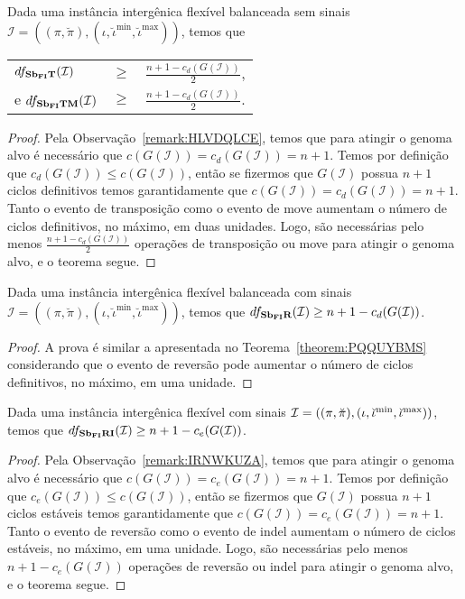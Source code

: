\begin{theorem}\label{theorem:PQQUYBMS}
Dada uma instância intergênica flexível balanceada sem sinais $\mathcal{I} = ((\pi,\breve\pi),(\iota,\breve\iota^{\min},\breve\iota^{\max}))$, temos que

\begin{tabular}{lll}
  $df_{\textbf{Sb\textsubscript{FI}T}}(\mathcal{I})$      & $ \ge $ & $\frac{{n+1} - c_d(G(\mathcal{I} ))}{2}$, \\
  e $df_{\textbf{Sb\textsubscript{FI}TM}}(\mathcal{I})$   & $ \ge $ & $\frac{{n+1} - c_d(G(\mathcal{I} ))}{2}$. \\
\end{tabular}
\end{theorem}
\begin{proof}
Pela Observação~\ref{remark:HLVDQLCE}, temos que para atingir o genoma alvo é necessário que $c(G(\mathcal{I})) = c_d(G(\mathcal{I})) = n+1$. Temos por definição que $c_d(G(\mathcal{I})) \le c(G(\mathcal{I}))$, então se fizermos que $G(\mathcal{I})$ possua $n+1$ ciclos definitivos temos garantidamente que $c(G(\mathcal{I})) = c_d(G(\mathcal{I})) = n+1$. Tanto o evento de transposição como o evento de move aumentam o número de ciclos definitivos, no máximo, em duas unidades. Logo, são necessárias pelo menos $\frac{{n+1} - c_d(G(\mathcal{I} ))}{2}$ operações de transposição ou move para atingir o genoma alvo, e o teorema segue. 
\end{proof}


\begin{theorem}\label{theorem:EUNBEQEX}
Dada uma instância intergênica flexível balanceada com sinais $\mathcal{I} = ((\pi,\breve\pi),(\iota,\breve\iota^{\min},\breve\iota^{\max}))$, temos que $df_{\textbf{Sb\textsubscript{FI}R}}(\mathcal{I}) \ge {n+1} - c_d(G(\mathcal{I} ))$.
\end{theorem}
\begin{proof}
A prova é similar a apresentada no Teorema~\ref{theorem:PQQUYBMS} considerando que o evento de reversão pode aumentar o número de ciclos definitivos, no máximo, em uma unidade.
\end{proof}

\begin{theorem}\label{theorem:SZNBDWOM}
Dada uma instância intergênica flexível com sinais $\mathcal{I} = ((\pi,\breve\pi),(\iota,\breve\iota^{\min},\break\breve\iota^{\max}))$, temos que $df_{\textbf{Sb\textsubscript{FI}RI}}(\mathcal{I}) \ge {n+1} - c_e(G(\mathcal{I} ))$.
\end{theorem}
\begin{proof}
Pela Observação~\ref{remark:IRNWKUZA}, temos que para atingir o genoma alvo é necessário que $c(G(\mathcal{I})) = c_e(G(\mathcal{I})) = n+1$. Temos por definição que $c_e(G(\mathcal{I})) \le c(G(\mathcal{I}))$, então se fizermos que $G(\mathcal{I})$ possua $n+1$ ciclos estáveis temos garantidamente que $c(G(\mathcal{I})) = c_e(G(\mathcal{I})) = n+1$. Tanto o evento de reversão como o evento de indel aumentam o número de ciclos estáveis, no máximo, em uma unidade. Logo, são necessárias pelo menos ${n+1} - c_e(G(\mathcal{I} ))$ operações de reversão ou indel para atingir o genoma alvo, e o teorema segue. 
\end{proof}

